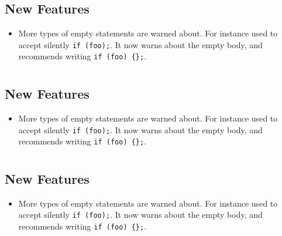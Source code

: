 \documentclass[openright,twoside,11pt]{book}
\begin{document}
\section{}

\subsection{New Features}
\begin{itemize}
\item More types of empty statements are warned about.  For instance \urbi
  used to accept silently \lstinline|if (foo);|.  It now warns about the empty
  body, and recommends writing \lstinline|if (foo) {};|.
\end{itemize}

\section{}

\subsection{New Features}
\begin{itemize}
\item More types of empty statements are warned about.  For instance \urbi
  used to accept silently \lstinline|if (foo);|.  It now warns about the empty
  body, and recommends writing \lstinline|if (foo) {};|.
\end{itemize}

\section{}

\subsection{New Features}
\begin{itemize}
\item More types of empty statements are warned about.  For instance \urbi
  used to accept silently \lstinline|if (foo);|.  It now warns about the empty
  body, and recommends writing \lstinline|if (foo) {};|.
\end{itemize}


\end{document}
